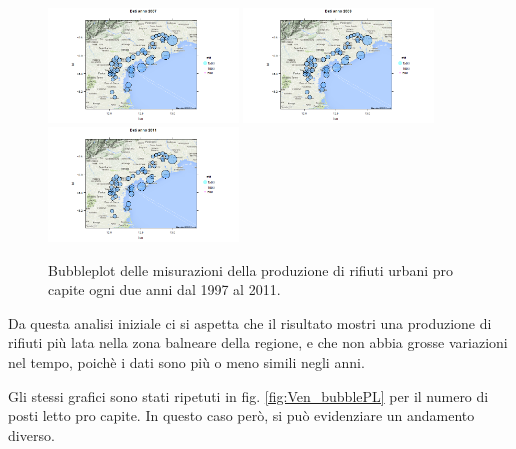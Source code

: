 \documentclass[a4paper,11pt,twoside,openright]{book}							%
\begin{document}
\begin{figure}[H]
\includegraphics[trim=0cm 0cm 0cm 0cm,clip=true,width=0.45\textwidth]{Immagini/venezia_dati/Dati2007.png}
\includegraphics[trim=0cm 0cm 0cm 0cm,clip=true,width=0.45\textwidth]{Immagini/venezia_dati/Dati2009.png}
\includegraphics[trim=0cm 0cm 0cm 0cm,clip=true,width=0.45\textwidth]{Immagini/venezia_dati/Dati2011.png}
\caption{Bubbleplot delle misurazioni della produzione di rifiuti urbani pro capite ogni due anni dal 1997 al 2011.}
\label{fig:Ven_bubbledati}
\end{figure}

\newpage
Da questa analisi iniziale ci si aspetta che il risultato mostri una produzione di rifiuti più lata nella zona balneare della regione, e che non abbia grosse variazioni nel tempo, poichè i dati sono più o meno simili negli anni.

Gli stessi grafici sono stati ripetuti in fig. \ref{fig:Ven_bubblePL} per il numero di posti letto pro capite. In questo caso però, si può evidenziare un andamento diverso.
\end{document}
